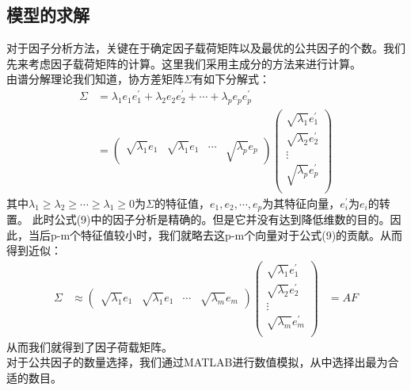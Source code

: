 \documentclass[a4paper]{article}
\begin{document}
\subsection{模型的求解}
对于因子分析方法，关键在于确定因子载荷矩阵以及最优的公共因子的个数。我们先来考虑因子载荷矩阵的计算。这里我们采用主成分的方法来进行计算。\\
由谱分解理论我们知道，协方差矩阵$\Sigma$有如下分解式：
\begin{equation}
\begin{aligned}
\Sigma &=\lambda_{1} e_{1} e_{1}^{\prime}+\lambda_{2} e_{2} e_{2}^{\prime}+\cdots+\lambda_{p} e_{p} e_{p}^{\prime}  \\
       &=\left(  
      \begin{array}{cccc}  
          \sqrt{\lambda_1}e_1 & \sqrt{\lambda_1}e_1&\cdots&\sqrt{\lambda_p}e_p
  \end{array}  
  \right)  
  \left(  
  \begin{array}{c}  
           \sqrt{\lambda_1}e_1^{\prime} \\  
          \sqrt{\lambda_2}e_2^{\prime}\\  
         \vdots                      \\
         \sqrt{\lambda_p}e_p^{\prime} \\
 \end{array}  
 \right)  
\end{aligned}
\end{equation}
其中$\lambda_1 \geq \lambda_2 \geq \cdots \geq \lambda_1 \geq 0$为$\Sigma$的特征值，$e_1,e_2,\cdots,e_p$为其特征向量，$e_i^{\prime}$为$e_i$的转置。
此时公式(9)中的因子分析是精确的。但是它并没有达到降低维数的目的。因此，当后p-m个特征值较小时，我们就略去这p-m个向量对于公式(9)的贡献。从而得到近似：
\begin{equation}
\begin{aligned}
\Sigma & \approx \left(  
      \begin{array}{cccc}  
          \sqrt{\lambda_1}e_1 & \sqrt{\lambda_1}e_1&\cdots&\sqrt{\lambda_m}e_m
  \end{array}  
  \right)  
  \left(  
  \begin{array}{c}  
           \sqrt{\lambda_1}e_1^{\prime} \\  
          \sqrt{\lambda_2}e_2^{\prime}\\  
         \vdots                      \\
         \sqrt{\lambda_m}e_m^{\prime} \\
 \end{array}  
 \right)  
   & =AF
 \end{aligned}
\end{equation}
从而我们就得到了因子荷载矩阵。\\
对于公共因子的数量选择，我们通过MATLAB进行数值模拟，从中选择出最为合适的数目。
\end{document}
